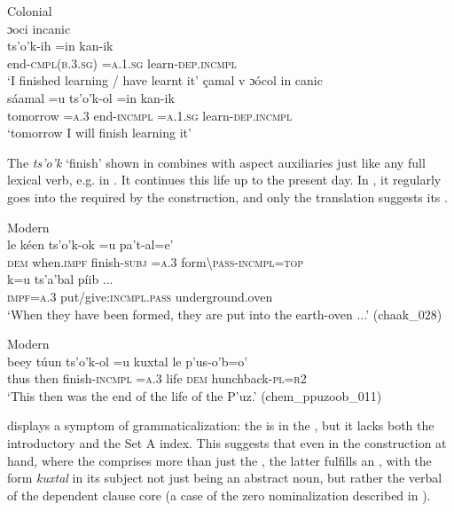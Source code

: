 \documentclass[output=paper]{langsci/langscibook}
\begin{document}
\ea\label{ex:lehmann:48}
Colonial  \\
\ea  ɔoci         incanic\\
\gll   ts'o'k-ih          =in      kan-ik\\
  end-\textsc{cmpl(b.3.sg)}    =\textsc{a.1.sg}    learn-\textsc{dep.incmpl}\\
\glt ‘I finished learning / have learnt it’ \citep[17r]{SanBuenaventura1684}  \newpage
\ex 
çamal    v      ɔócol      in        canic\\
\gll   sáamal    =u    ts'o'k-ol    =in      kan-ik\\
tomorrow  =\textsc{a.3}    end-\textsc{incmpl} \textsc{=a.1.sg}   learn-\textsc{dep.incmpl}\\
\glt ‘tomorrow I will finish learning it’ \citep[35]{Coronel1620}
\z
\z 


The  \textit{ts’o’k} ‘finish’ shown in  combines with aspect auxiliaries just like any full lexical verb, e.g. in . It continues this life up to the present day. In , it regularly goes into the  required by the construction, and only the translation suggests its .


\ea\label{ex:lehmann:49}
Modern   \\
\gll       le      kéen        ts'o'k-ok    =u    pa't-al=e'\\
  \textsc{dem}    when.\textsc{impf}  finish-\textsc{subj }  \textsc{=a.3}    form{\textbackslash}\textsc{pass-incmpl=top}\\

\gll   k=u      ts'a'bal              píib ...\\
\textsc{impf=a.3}  put/give:\textsc{incmpl.pass}  underground.oven\\
\glt ‘When they have been formed, they are put into the earth-oven ...’ (chaak\_028)
\z


\ea\label{ex:lehmann:50}
Modern  \\
\gll      beey  túun    ts'o'k-ol      =u    kuxtal  le      p'us-o'b=o'\\
  thus    then    finish-\textsc{incmpl } \textsc{=a.3}   life    \textsc{dem}    hunchback-\textsc{pl=r2}\\
\glt ‘This then was the end of the life of the P'uz.’ (chem\_ppuzoob\_011)
\z

 displays a symptom of grammaticalization: the  is in the , but it lacks both the introductory   and the Set A index. This suggests that even in the construction at hand, where the  comprises more than just the , the latter fulfills an , with the form \textit{kuxtal} in its subject not just being an abstract noun, but rather the verbal  of the dependent clause core (a case of the zero nominalization described in ).
\end{document}
